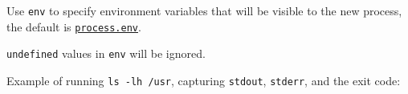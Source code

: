 Use \texttt{env} to specify environment variables that will be visible
to the new process, the default is
\href{process.md\#processenv}{\texttt{process.env}}.

\texttt{undefined} values in \texttt{env} will be ignored.

Example of running \texttt{ls\ -lh\ /usr}, capturing \texttt{stdout},
\texttt{stderr}, and the exit code:

\begin{Shaded}
\begin{Highlighting}[]
\OperatorTok{=} \NormalTok{(}\NormalTok{)}\OperatorTok{;}
\OperatorTok{=} \NormalTok{(}\OperatorTok{,}\NormalTok{ [}\OperatorTok{,} \NormalTok{])}\OperatorTok{;}

\NormalTok{(}\OperatorTok{,}\KeywordTok{=\textgreater{}}\NormalTok{ \{}
  \NormalTok{(}\SpecialCharTok{$\{}\SpecialCharTok{\}}\VerbatimStringTok{\textasciigrave{}}\NormalTok{)}\OperatorTok{;}
\NormalTok{\})}\OperatorTok{;}

\NormalTok{(}\OperatorTok{,}\KeywordTok{=\textgreater{}}\NormalTok{ \{}
  \NormalTok{(}\SpecialCharTok{$\{}\SpecialCharTok{\}}\VerbatimStringTok{\textasciigrave{}}\NormalTok{)}\OperatorTok{;}
\NormalTok{\})}\OperatorTok{;}

\NormalTok{(}\OperatorTok{,}\KeywordTok{=\textgreater{}}\NormalTok{ \{}
  \NormalTok{(}\SpecialCharTok{$\{}\SpecialCharTok{\}}\VerbatimStringTok{\textasciigrave{}}\NormalTok{)}\OperatorTok{;}
\NormalTok{\})}\OperatorTok{;}
\end{Highlighting}
\end{Shaded}

